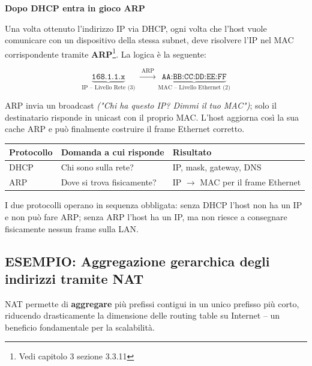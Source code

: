 \documentclass[a4paper,12pt]{report}
\begin{document}
\begin{esempiobox}[title=Incapsulamento DHCP (DORA) e collegamento con ARP]
\newpage
\textbf{Dopo DHCP entra in gioco ARP}

Una volta ottenuto l'indirizzo IP via DHCP, ogni volta che l'host vuole comunicare con un dispositivo della stessa subnet, deve risolvere l'IP nel MAC corrispondente tramite \textbf{ARP}\footnote{Vedi capitolo 3 sezione 3.3.11}. La logica è la seguente:

$$
    \underbrace{\texttt{168.1.1.x}}_{\text{IP -- Livello Rete (3)}}
    \;\xrightarrow{\;\text{ARP}\;}
    \underbrace{\texttt{AA:BB:CC:DD:EE:FF}}_{\text{MAC -- Livello Ethernet (2)}}
$$

ARP invia un broadcast \textit{("Chi ha questo IP? Dimmi il tuo MAC")}; solo il destinatario risponde in unicast con il proprio MAC. L'host aggiorna così la sua cache ARP e può finalmente costruire il frame Ethernet corretto.

\begin{center}
\begin{tabular}{lll}
\toprule
\textbf{Protocollo} & \textbf{Domanda a cui risponde} & \textbf{Risultato} \\
\midrule
DHCP & Chi sono sulla rete? & IP, mask, gateway, DNS \\
ARP  & Dove si trova fisicamente? & IP $\to$ MAC per il frame Ethernet \\
\bottomrule
\end{tabular}
\end{center}

I due protocolli operano in sequenza obbligata: senza DHCP l'host non ha un IP e non può fare ARP; senza ARP l'host ha un IP, ma non riesce a consegnare fisicamente nessun frame sulla LAN.

\end{esempiobox}





\newpage


\newpage
\subsection{ESEMPIO: Aggregazione gerarchica degli indirizzi tramite NAT}

NAT permette di \textbf{aggregare} più prefissi contigui in un unico
prefisso più corto, riducendo drasticamente la dimensione delle routing
table su Internet -- un beneficio fondamentale per la scalabilità.
\end{document}
